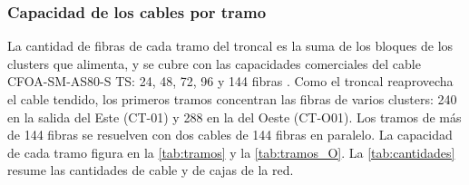 \subsubsection{Capacidad de los cables por tramo}
La cantidad de fibras de cada tramo del troncal es la suma de los bloques de los clusters que alimenta, y se cubre con las capacidades comerciales del cable CFOA-SM-AS80-S TS: 24, 48, 72, 96 y 144 fibras \cite{et_as_ts}. Como el troncal reaprovecha el cable tendido, los primeros tramos concentran las fibras de varios clusters: 240 en la salida del Este (CT-01) y 288 en la del Oeste (CT-O01). Los tramos de más de 144 fibras se resuelven con dos cables de 144 fibras en paralelo. La capacidad de cada tramo figura en la \autoref{tab:tramos} y la \autoref{tab:tramos_O}. La \autoref{tab:cantidades} resume las cantidades de cable y de cajas de la red.

